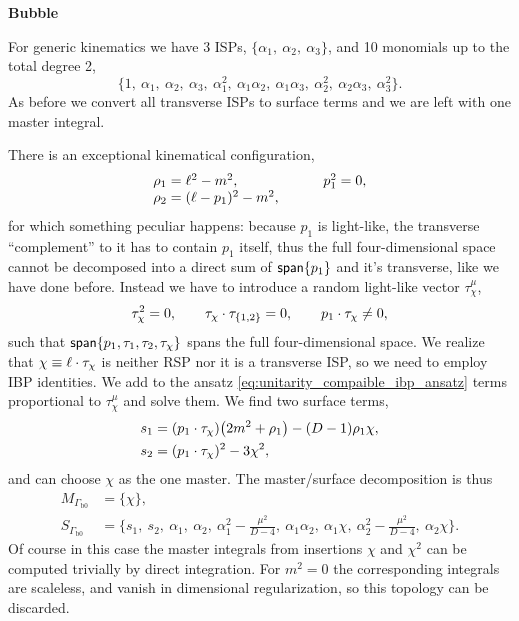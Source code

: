 \textbf{Bubble}

For generic kinematics we have 3 ISPs, $\{\alpha_1,~\alpha_2,~\alpha_3\}$, and
10 monomials up to the total degree 2,
\[
  \{1,~\alpha_1,~\alpha_2,~\alpha_3,~\alpha_1^2,~\alpha_1\alpha_2,~\alpha_1\alpha_3,~\alpha_2^2,~\alpha_2\alpha_3,~ \alpha_3^2\}.
\]
As before we convert all transverse ISPs to surface terms and we are left with one master integral.

There is an exceptional kinematical configuration,
\begin{equation*}
  \begin{tabular}{ll}
    $\rho_1 = \ell^2-m^2$,               &  \qquad $p_1^2=0$,\\
    $\rho_2 = (\ell-p_1)^2-m^2$,         &  \\
  \end{tabular}
\end{equation*}
for which something peculiar happens:
because $p_1$ is light-like, the transverse ``complement'' to it has to contain $p_1$ itself, thus the full four-dimensional space
cannot be decomposed into a direct sum of $\mathsf{span}\{p_1\}$ and it's transverse, like we have done before.
Instead we have to introduce a random light-like vector $\tau_\chi^\mu$,
\[
  \tau_\chi^2=0, \qquad \sp(\tau_\chi,\tau_{\{1,2\}}) = 0, \qquad  \sp(p_1,\tau_\chi) \neq 0,
\]
such that $\mathsf{span}\{p_1,\tau_1,\tau_2,\tau_\chi\}$ spans the full four-dimensional space.
We realize that $\chi \equiv \sp(\ell,\tau_\chi)$ is neither RSP nor it is a transverse ISP, so 
we need to employ IBP identities.
We add to the ansatz \eqref{eq:unitarity_compaible_ibp_ansatz} terms proportional to $\tau_\chi^\mu$ and solve them.
We find two surface terms,
\begin{align*}
  s_1 &= (\sp(p_1,\tau_\chi)) \qty(2 m^2 + \rho_1) - (D-1)\rho_1\chi, \\
  s_2 &= (\sp(p_1,\tau_\chi))^2 - 3 \chi^2,
\end{align*}
and can choose $\chi$ as the one master. The master/surface decomposition is thus
\begin{align*}
  M_{\Gamma_\text{b0} } &= \{\chi\}, \\
   S_{\Gamma_\text{b0} } &= 
  \{s_1,~s_2,~\alpha_1,~\alpha_2,~\alpha_1^2 - \frac{\mu^2}{D-4},~\alpha_1\alpha_2,~ \alpha_1\chi,~\alpha_2^2-\frac{\mu^2}{D-4},~\alpha_2\chi \}.
\end{align*}
Of course in this case the master integrals from insertions $\chi$ and $\chi^2$ can be computed trivially by direct integration.
For $m^2=0$ the corresponding integrals are scaleless, and vanish in dimensional regularization,
so this topology can be discarded.


